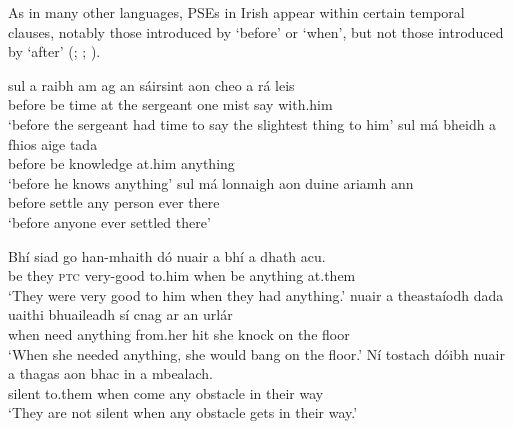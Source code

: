 \documentclass[output=paper,colorlinks,citecolor=brown]{langscibook}
\begin{document}

As in many other languages, PSEs in Irish appear within certain temporal clauses, notably those introduced by `before' or `when', but not those introduced by `after' (\cite{linebarger:87}; \cite{condoravdi:10}; \cite{krifka:10}).

\ea
\ea
\gll sul a raibh am ag an sáirsint aon cheo a rá leis \\
     before {\go} {be\past} time at the sergeant one mist {\vce} {say\vn} with.him \\
\glt `before the sergeant had time to say the slightest thing to him'
\ex
\gll sul má bheidh {a fhios} aige tada \\
     before {\C} {be\fut} knowledge at.him anything \\
\glt `before he knows anything'
\ex
\gll sul má lonnaigh aon duine ariamh ann \\
     before {\go} {settle\past} any person ever there \\
\glt `before anyone ever settled there'
\z
\z


\ea
\ea
\gll Bhí siad go han-mhaith dó nuair a bhí {a dhath} acu. \\
     {be\past} they {\scshape ptc} {very-good} to.him when {\C} {be\past} anything at.them \\ 
\glt `They were very good to him when they had anything.'
\ex
\gll nuair a theastaíodh dada uaithi bhuaileadh sí cnag ar an urlár \\
     when {\go} {need\pasthabit} anything from.her {hit\pasthabit} she knock on the floor \\
\glt `When she needed anything, she would bang on the floor.'
\ex
\gll Ní tostach dóibh nuair a thagas aon bhac in a mbealach. \\
     {\negcop} silent {to.them} when {\go} {come\pres} any obstacle in their way \\
\glt `They are not silent when any obstacle gets in their way.'
\z
\z
\end{document}
